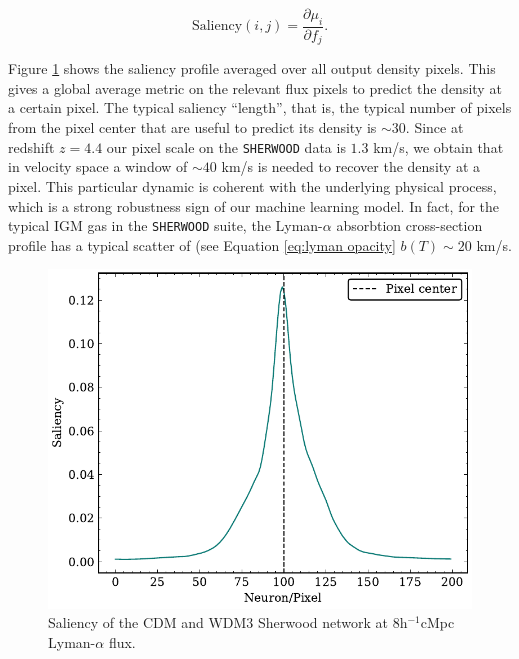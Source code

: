 \begin{equation}
    \text{Saliency}(i,j) = \frac{\partial  \mu_i}{\partial f_j}.
\end{equation}

Figure \ref{fig: saliency} shows the saliency profile averaged over all output density pixels. This gives a global average metric on the relevant flux pixels to predict the density at a certain pixel. The typical saliency ``length'', that is, the typical number of pixels from the pixel center that are useful to predict its density is $\sim 30$. Since at redshift $z=4.4$ our pixel scale on the \texttt{SHERWOOD} data is $1.3$ km/s, we obtain that in velocity space a window of $\sim 40$ km/s is needed to recover the density at a pixel. This particular dynamic is coherent with the underlying physical process, which is a strong robustness sign of our machine learning model. In fact, for the typical IGM gas in the \texttt{SHERWOOD} suite, the Lyman-$\alpha$ absorbtion cross-section profile has a typical scatter of (see Equation \ref{eq:lyman opacity} $ b(T) \sim 20$ km/s.


\begin{figure}
    \centering
    \includegraphics[width=0.6\linewidth]{img/ML/saliency.pdf}
    \caption{Saliency of the CDM and WDM3 Sherwood network at 8h$^{-1}$cMpc Lyman-$\alpha$ flux.}
    \label{fig: saliency}
\end{figure}



